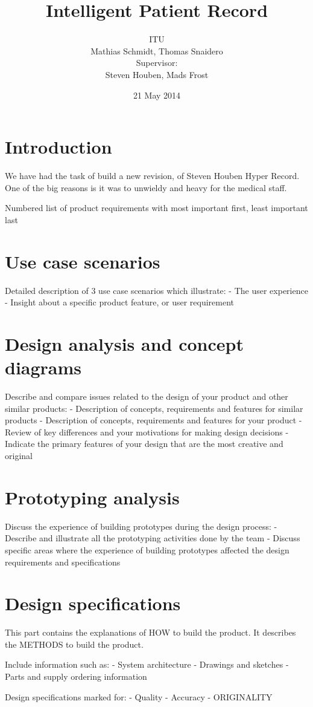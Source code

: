 \documentclass{article}
\title{Intelligent Patient Record}
\author{ITU \\
Mathias Schmidt, Thomas Snaidero \\
Supervisor: \\
Steven Houben, Mads Frost}
\date{21 May 2014}
\begin{document}
\maketitle

\pagebreak

\tableofcontents

\pagebreak


\section{Introduction}
We have had the task of build a new revision, of Steven Houben Hyper Record.
One of the big reasons is it was to unwieldy and heavy for the medical staff.


Numbered list of product requirements with most important first, least important last


\section{Use case scenarios}
Detailed description of 3 use case scenarios which illustrate:
- The user experience
- Insight about a specific product feature, or user requirement


\section{Design analysis and concept diagrams}
Describe and compare issues related to the design of your product and other similar products:
- Description of concepts, requirements and features for similar products
- Description of concepts, requirements and features for your product
- Review of key differences and your motivations for making design decisions
- Indicate the primary features of your design that are the most creative and original

\section{Prototyping analysis}
Discuss the experience of building prototypes during the design process:
- Describe and illustrate all the prototyping activities done by the team
- Discuss specific areas where the experience of building prototypes affected the design requirements and specifications


\section{Design specifications}
This part contains the explanations of HOW to build the product. It describes the METHODS to build the product.

Include information such as:
- System architecture
- Drawings and sketches
- Parts and supply ordering information

Design specifications marked for:
- Quality
- Accuracy
- ORIGINALITY



% 

% 

% 
\end{document}

